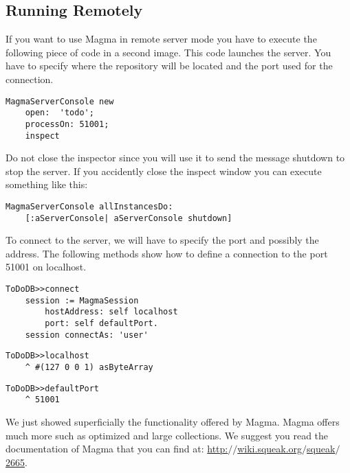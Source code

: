 \documentclass[a4paper,10pt,twoside]{book}
\newcommand{\ct}[1]{{\small\ttfamily\textup{#1}}}
\begin{document}
\subsection{Running Remotely}
\label{book:advanced:persistency:magma:remotely}

If you want to use Magma in remote server mode you have to execute the following piece of code in a second image. This code launches the server. You have to specify where the repository will be located and the port used for the connection.

\begin{lstlisting}
MagmaServerConsole new
    open:  'todo';
    processOn: 51001;
    inspect
\end{lstlisting}

Do not close the inspector since you will use it to send the message \ct{shutdown} to stop the server. If you accidently close the inspect window you can execute something like this:
 

\begin{lstlisting}
MagmaServerConsole allInstancesDo:
    [:aServerConsole| aServerConsole shutdown]
\end{lstlisting}

To connect to the server, we will have to specify the port and possibly the address. The following methods show how to define a connection to the port 51001 on localhost.

\begin{lstlisting}
ToDoDB>>connect
    session := MagmaSession
        hostAddress: self localhost
        port: self defaultPort.
    session connectAs: 'user'
\end{lstlisting}

\begin{lstlisting}
ToDoDB>>localhost
    ^ #(127 0 0 1) asByteArray
\end{lstlisting}

\begin{lstlisting}
ToDoDB>>defaultPort
    ^ 51001
\end{lstlisting}

We just showed superficially the functionality offered by Magma. Magma offers much more such as optimized and large collections. We suggest you read the documentation of Magma that you can find at: \href{http://wiki.squeak.org/squeak/2665}{http:$/$$/$wiki.squeak.org$/$squeak$/$2665}.
\end{document}
